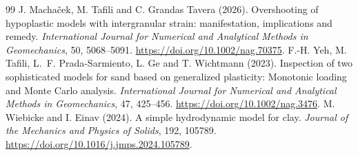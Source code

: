 \documentclass[11pt,a4paper]{article}
\begin{document}
\begin{thebibliography}{99}
 J. Macha\v{c}ek, M. Tafili and C. Grandas Tavera (2026). Overshooting of hypoplastic models with intergranular strain: manifestation, implications and remedy. \emph{International Journal for Numerical and Analytical Methods in Geomechanics}, 50, 5068--5091. \url{https://doi.org/10.1002/nag.70375}.
 F.-H. Yeh, M. Tafili, L.~F. Prada-Sarmiento, L. Ge and T. Wichtmann (2023). Inspection of two sophisticated models for sand based on generalized plasticity: Monotonic loading and Monte Carlo analysis. \emph{International Journal for Numerical and Analytical Methods in Geomechanics}, 47, 425--456. \url{https://doi.org/10.1002/nag.3476}.
 M. Wiebicke and I. Einav (2024). A simple hydrodynamic model for clay. \emph{Journal of the Mechanics and Physics of Solids}, 192, 105789. \url{https://doi.org/10.1016/j.jmps.2024.105789}.
\end{thebibliography}
\end{document}
